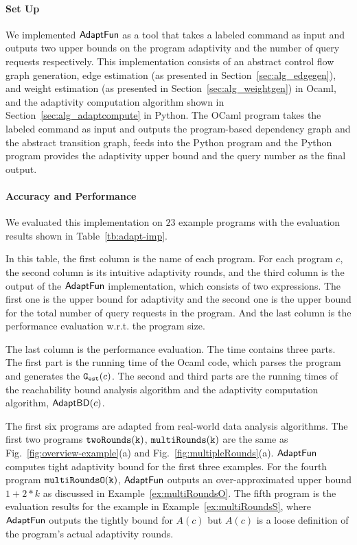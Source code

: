 
\paragraph{Set Up}
We implemented $\textsf{AdaptFun}$ as a tool that takes a labeled command as input 
and outputs two upper bounds on the program adaptivity and the number of query requests respectively.
This implementation consists of an 
abstract control flow graph generation,
edge estimation (as presented in Section~\ref{sec:alg_edgegen}), and weight estimation (as presented in Section~\ref{sec:alg_weightgen}) in Ocaml, 
and the adaptivity computation algorithm shown in Section~\ref{sec:alg_adaptcompute} in Python.
The OCaml program takes the labeled command as input and outputs the program-based dependency graph and
the abstract transition graph,
feeds into the Python program and the Python program provides the adaptivity upper bound and the query number as the final output.


\paragraph{Accuracy and Performance}

We evaluated this implementation on $23$ example programs with the evaluation results shown in Table~\ref{tb:adapt-imp}.

In this table,
the first column is the name of each program.
For each program $c$, the second column is its intuitive adaptivity rounds,
and the third column is the output of the $\textsf{AdaptFun}$ implementation, which consists of two expressions.
The first one is the upper bound for adaptivity and the second one is the 
upper bound for the total number of query requests in the program. And the last column is the performance evaluation w.r.t. the program size.

The last column is the performance evaluation.
The time contains three parts. The first part is the running time of the Ocaml code, which parses the program and generates the $\mathtt{{G_{est}}}(c)$.
The second and third parts are the running times of the reachability bound analysis algorithm
and the adaptivity computation algorithm, $\mathsf{AdaptBD}(c)$.

The first six programs are adapted from real-world data analysis algorithms.
The first two programs $\mathtt{twoRounds(k)}$, $ \mathtt{multiRounds(k)}$ are the same as Fig.~\ref{fig:overview-example}(a) and Fig.~\ref{fig:multipleRounds}(a).
$\textsf{AdaptFun}$ computes tight adaptivity bound for the first three examples.
For the fourth program $\mathtt{multiRoundsO(k)}$, $\textsf{AdaptFun}$ outputs an over-approximated upper bound $1 + 2*k$ 
as discussed in Example~\ref{ex:multiRoundsO}. 
The fifth program is the evaluation results for the example in Example~\ref{ex:multiRoundsS}, where $\textsf{AdaptFun}$ outputs the tightly bound for $A(c)$ but $A(c)$ is a loose definition of the program's actual adaptivity rounds.
%

